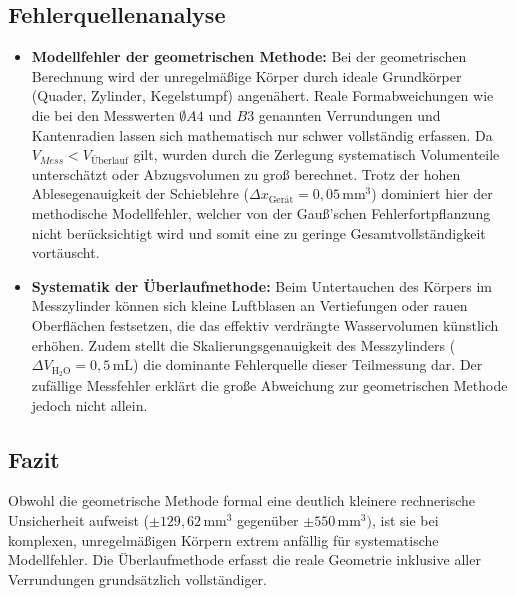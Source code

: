 \subsection{Fehlerquellenanalyse}
\begin{itemize}
	\item \textbf{Modellfehler der geometrischen Methode:} Bei der geometrischen Berechnung wird der unregelmäßige Körper durch ideale Grundkörper (Quader, Zylinder, Kegelstumpf) angenähert. Reale Formabweichungen wie die bei den Messwerten $\emptyset A4$ und $B3$ genannten Verrundungen und Kantenradien lassen sich mathematisch nur schwer vollständig erfassen. Da $V_{Mess} < V_{\text{Überlauf}}$ gilt, wurden durch die Zerlegung systematisch Volumenteile unterschätzt oder Abzugsvolumen zu groß berechnet. Trotz der hohen Ablesegenauigkeit der Schieblehre ($\Delta x_{\text{Gerät}} = 0,05\,\unit{\mm\cubed}$) dominiert hier der methodische Modellfehler, welcher von der Gauß'schen Fehlerfortpflanzung nicht berücksichtigt wird und somit eine zu geringe Gesamtvollständigkeit vortäuscht.
	\item \textbf{Systematik der Überlaufmethode:} Beim Untertauchen des Körpers im Messzylinder können sich kleine Luftblasen an Vertiefungen oder rauen Oberflächen festsetzen, die das effektiv verdrängte Wasservolumen künstlich erhöhen. Zudem stellt die Skalierungsgenauigkeit des Messzylinders ($\Delta V_{\mathrm{H_2O}} = 0,5\,\unit{\milli\liter}$) die dominante Fehlerquelle dieser Teilmessung dar. Der zufällige Messfehler erklärt die große Abweichung zur geometrischen Methode jedoch nicht allein.
\end{itemize}

\subsection{Fazit}
Obwohl die geometrische Methode formal eine deutlich kleinere rechnerische Unsicherheit aufweist ($\pm 129{,}62\,\unit{\mm\cubed}$ gegenüber $\pm 550\,\unit{\mm\cubed})$, ist sie bei komplexen, unregelmäßigen Körpern extrem anfällig für systematische Modellfehler. Die Überlaufmethode erfasst die reale Geometrie inklusive aller Verrundungen grundsätzlich vollständiger.